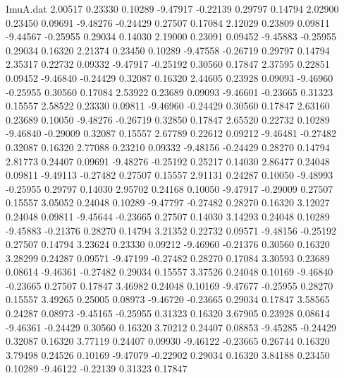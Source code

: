\begin{filecontents}{ImuA.dat}
   2.00517    0.23330    0.10289   -9.47917   -0.22139    0.29797    0.14794
   2.02900    0.23450    0.09691   -9.48276   -0.24429    0.27507    0.17084
   2.12029    0.23809    0.09811   -9.44567   -0.25955    0.29034    0.14030
   2.19000    0.23091    0.09452   -9.45883   -0.25955    0.29034    0.16320
   2.21374    0.23450    0.10289   -9.47558   -0.26719    0.29797    0.14794
   2.35317    0.22732    0.09332   -9.47917   -0.25192    0.30560    0.17847
   2.37595    0.22851    0.09452   -9.46840   -0.24429    0.32087    0.16320
   2.44605    0.23928    0.09093   -9.46960   -0.25955    0.30560    0.17084
   2.53922    0.23689    0.09093   -9.46601   -0.23665    0.31323    0.15557
   2.58522    0.23330    0.09811   -9.46960   -0.24429    0.30560    0.17847
   2.63160    0.23689    0.10050   -9.48276   -0.26719    0.32850    0.17847
   2.65520    0.22732    0.10289   -9.46840   -0.29009    0.32087    0.15557
   2.67789    0.22612    0.09212   -9.46481   -0.27482    0.32087    0.16320
   2.77088    0.23210    0.09332   -9.48156   -0.24429    0.28270    0.14794
   2.81773    0.24407    0.09691   -9.48276   -0.25192    0.25217    0.14030
   2.86477    0.24048    0.09811   -9.49113   -0.27482    0.27507    0.15557
   2.91131    0.24287    0.10050   -9.48993   -0.25955    0.29797    0.14030
   2.95702    0.24168    0.10050   -9.47917   -0.29009    0.27507    0.15557
   3.05052    0.24048    0.10289   -9.47797   -0.27482    0.28270    0.16320
   3.12027    0.24048    0.09811   -9.45644   -0.23665    0.27507    0.14030
   3.14293    0.24048    0.10289   -9.45883   -0.21376    0.28270    0.14794
   3.21352    0.22732    0.09571   -9.48156   -0.25192    0.27507    0.14794
   3.23624    0.23330    0.09212   -9.46960   -0.21376    0.30560    0.16320
   3.28299    0.24287    0.09571   -9.47199   -0.27482    0.28270    0.17084
   3.30593    0.23689    0.08614   -9.46361   -0.27482    0.29034    0.15557
   3.37526    0.24048    0.10169   -9.46840   -0.23665    0.27507    0.17847
   3.46982    0.24048    0.10169   -9.47677   -0.25955    0.28270    0.15557
   3.49265    0.25005    0.08973   -9.46720   -0.23665    0.29034    0.17847
   3.58565    0.24287    0.08973   -9.45165   -0.25955    0.31323    0.16320
   3.67905    0.23928    0.08614   -9.46361   -0.24429    0.30560    0.16320
   3.70212    0.24407    0.08853   -9.45285   -0.24429    0.32087    0.16320
   3.77119    0.24407    0.09930   -9.46122   -0.23665    0.26744    0.16320
   3.79498    0.24526    0.10169   -9.47079   -0.22902    0.29034    0.16320
   3.84188    0.23450    0.10289   -9.46122   -0.22139    0.31323    0.17847

\end{filecontents}

